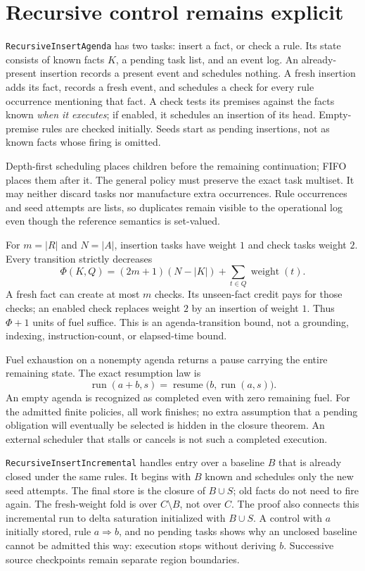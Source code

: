 \documentclass[11pt,a4paper]{article}
\newcommand{\code}[1]{\nolinkurl{#1}}
\begin{document}
\section{Recursive control remains explicit}

\code{RecursiveInsertAgenda} has two tasks: insert a fact, or check a rule.
Its state consists of known facts $K$, a pending task list, and an event log.
An already-present insertion records a present event and schedules nothing.
A fresh insertion adds its fact, records a fresh event, and schedules a
check for every rule occurrence mentioning that fact. A check tests its
premises against the facts known \emph{when it executes}; if enabled, it
schedules an insertion of its head. Empty-premise rules are checked initially.
Seeds start as pending insertions, not as known facts whose firing is omitted.

Depth-first scheduling places children before the remaining continuation;
FIFO places them after it. The general policy must preserve the exact task
multiset. It may neither discard tasks nor manufacture extra occurrences.
Rule occurrences and seed attempts are lists, so duplicates remain visible
to the operational log even though the reference semantics is set-valued.

For $m=|R|$ and $N=|A|$, insertion tasks have weight $1$ and check tasks
weight $2$. Every transition strictly decreases
\[
  \Phi(K,Q)=(2m+1)(N-|K|)+\sum_{t\in Q}\operatorname{weight}(t).
\]
A fresh fact can create at most $m$ checks. Its unseen-fact credit pays for
those checks; an enabled check replaces weight $2$ by an insertion of weight
$1$. Thus $\Phi+1$ units of fuel suffice. This is an agenda-transition bound,
not a grounding, indexing, instruction-count, or elapsed-time bound.

Fuel exhaustion on a nonempty agenda returns a pause carrying the entire
remaining state. The exact resumption law is
\[
  \operatorname{run}(a+b,s)
  =\operatorname{resume}\bigl(b,\operatorname{run}(a,s)\bigr).
\]
An empty agenda is recognized as completed even with zero remaining fuel.
For the admitted finite policies, all work finishes; no extra assumption
that a pending obligation will eventually be selected is hidden in the
closure theorem. An external scheduler that stalls or cancels is not such
a completed execution.

\code{RecursiveInsertIncremental} handles entry over a baseline $B$ that is
already closed under the same rules. It begins with $B$ known and schedules
only the new seed attempts. The final store is the closure of $B\cup S$;
old facts do not need to fire again. The fresh-weight fold is over
$C\setminus B$, not over $C$. The proof also connects this incremental run
to delta saturation initialized with $B\cup S$. A control with $a$ initially
stored, rule $a\Rightarrow b$, and no pending tasks shows why an unclosed
baseline cannot be admitted this way: execution stops without deriving $b$.
Successive source checkpoints remain separate region boundaries.
\end{document}
